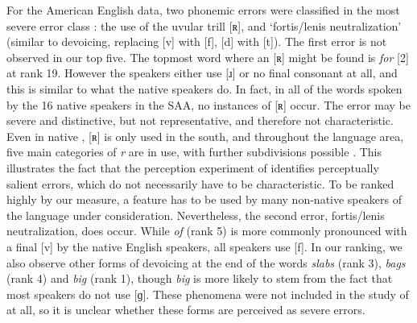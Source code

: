 \documentclass[output=paper]{LSP/langsci}
\begin{document}
For the American English data, two phonemic errors were classified in the most severe error class \citet{van_den_doel_evaluation_2006}: the use of the uvular trill [ʀ], and `fortis/lenis neutralization' (similar to devoicing, replacing [v] with [f], [d] with [t]).
The first error is not observed in our top five. The topmost word where an [ʀ] might be found is \textit{for} [2] at rank 19. However the  speakers either use [ɹ] or no final consonant at all, and this is similar to what the native speakers do. In fact, in all of the words spoken by the 16  native speakers in the SAA, no instances of [ʀ] occur. The error may be severe and distinctive, but not representative, and therefore not characteristic. Even in native , [ʀ] is only used in the south, and throughout the  language area, five main categories of \textit{r} are in use, with further subdivisions possible \citep{sebregts_sociophonetics_2015}. 
This illustrates the fact that the perception experiment of \citet{van_den_doel_evaluation_2006} identifies perceptually salient errors, which do not necessarily have to be characteristic. To be ranked highly by our measure, a feature has to be used by many non-native speakers of the language under consideration. Nevertheless, the second error, fortis/lenis neutralization, does occur. While \textit{of} (rank 5) is more commonly pronounced with a final [v] by the native English speakers, all  speakers use [f]. In our ranking, we also observe other forms of devoicing at the end of the words \textit{slabs} (rank 3), \textit{bags} (rank 4) and \textit{big} (rank 1), though \textit{big} is more likely to stem from the fact that most  speakers do not use [ɡ]. These phenomena were not included in the study of \citet{van_den_doel_evaluation_2006} at all, so it is unclear whether these forms are perceived as severe errors.
\end{document}
